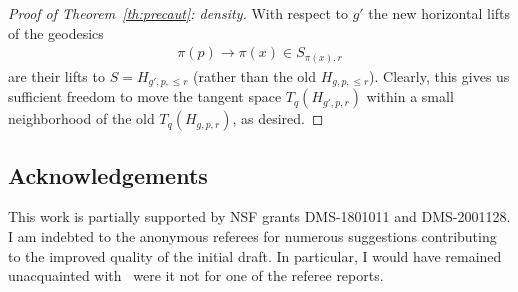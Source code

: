 \documentclass[pdftex]{sigma}%
\numberwithin{equation}{section}
\begin{document}
\begin{proof}[Proof of Theorem~\ref{th:precaut}: density]
 With respect to $g'$ the new horizontal lifts of the geodesics
 \begin{gather*}
 \pi(p)\to \pi(x)\in S_{\pi(x),r}
 \end{gather*}
 are their lifts to $S=H_{g',p,\le r}$ (rather than the old $H_{g,p,\le r}$). Clearly, this gives us sufficient freedom to move the tangent space $T_q(H_{g',p,r})$ within a small neighborhood of the old $T_q(H_{g,p,r})$, as desired.
\end{proof}


\subsection*{Acknowledgements}

This work is partially supported by NSF grants DMS-1801011 and DMS-2001128.
I am indebted to the anonymous referees for numerous suggestions contributing to the improved quality of the initial draft. In particular, I would have remained unacquainted with~\cite{bd,sz} were it not for one of the referee reports.
\end{document}
